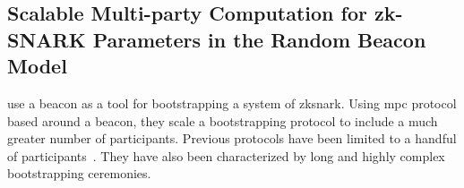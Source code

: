 \subsection{Scalable Multi-party Computation for zk-SNARK Parameters in the Random Beacon Model}%
\label{sub:scalable_mpc_zk_snarks}
\citet{mpcsnarks} use a beacon as a tool for bootstrapping a system of \gls{zksnark}.
Using \gls{mpc} protocol based around a beacon, they scale a bootstrapping protocol to include a much greater number of participants.
Previous protocols have been limited to a handful of participants~\cite{snarkparameters}. They have also been characterized by long and highly complex bootstrapping ceremonies.
